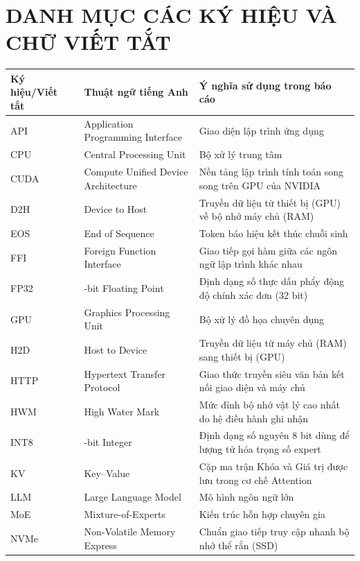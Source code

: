 \chapter*{DANH MỤC CÁC KÝ HIỆU VÀ CHỮ VIẾT TẮT}

\begin{longtable}{@{}>{\RaggedRight\arraybackslash}p{2.2cm} >{\RaggedRight\arraybackslash}p{4.4cm} >{\RaggedRight\arraybackslash}p{8.5cm}@{}}
\toprule
\rowcolor{tableheader}
\textbf{Ký hiệu/Viết tắt} & \textbf{Thuật ngữ tiếng Anh} & \textbf{Ý nghĩa sử dụng trong báo cáo} \\
\midrule
\endhead
\bottomrule
\endfoot

API & Application Programming Interface & Giao diện lập trình ứng dụng \\
CPU & Central Processing Unit & Bộ xử lý trung tâm \\
CUDA & Compute Unified Device Architecture & Nền tảng lập trình tính toán song song trên GPU của NVIDIA \\
D2H & Device to Host & Truyền dữ liệu từ thiết bị (GPU) về bộ nhớ máy chủ (RAM) \\
EOS & End of Sequence & Token báo hiệu kết thúc chuỗi sinh \\
FFI & Foreign Function Interface & Giao tiếp gọi hàm giữa các ngôn ngữ lập trình khác nhau \\
FP32 & 32-bit Floating Point & Định dạng số thực dấu phẩy động độ chính xác đơn (32 bit) \\
GPU & Graphics Processing Unit & Bộ xử lý đồ họa chuyên dụng \\
H2D & Host to Device & Truyền dữ liệu từ máy chủ (RAM) sang thiết bị (GPU) \\
HTTP & Hypertext Transfer Protocol & Giao thức truyền siêu văn bản kết nối giao diện và máy chủ \\
HWM & High Water Mark & Mức đỉnh bộ nhớ vật lý cao nhất do hệ điều hành ghi nhận \\
INT8 & 8-bit Integer & Định dạng số nguyên 8 bit dùng để lượng tử hóa trọng số expert \\
KV & Key--Value & Cặp ma trận Khóa và Giá trị được lưu trong cơ chế Attention \\
LLM & Large Language Model & Mô hình ngôn ngữ lớn \\
MoE & Mixture-of-Experts & Kiến trúc hỗn hợp chuyên gia \\
NVMe & Non-Volatile Memory Express & Chuẩn giao tiếp truy cập nhanh bộ nhớ thể rắn (SSD) \\

\end{longtable}

